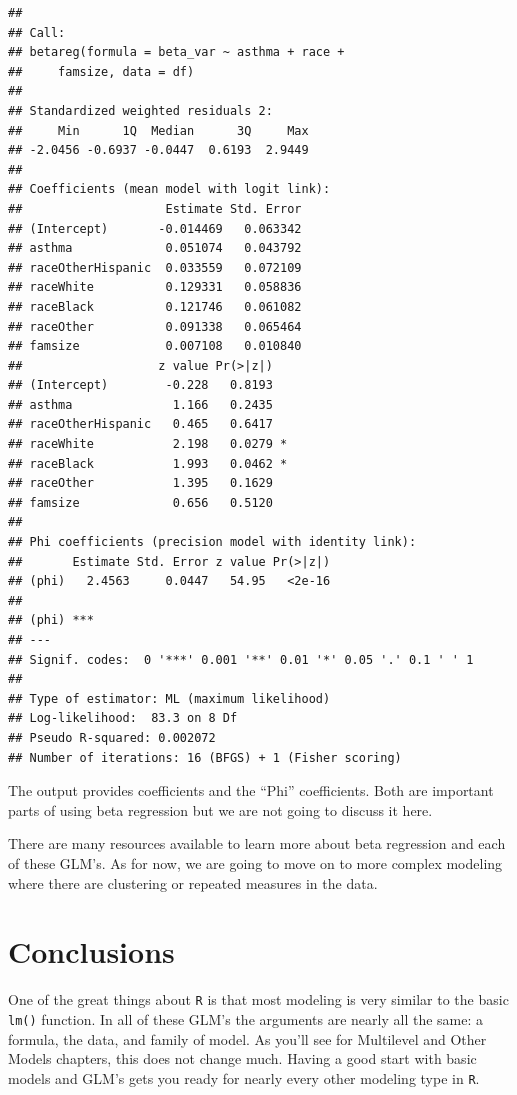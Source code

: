 \documentclass[]{tufte-book}
\theoremstyle{definition}
\theoremstyle{definition}
\theoremstyle{remark}
\begin{document}
\begin{verbatim}
## 
## Call:
## betareg(formula = beta_var ~ asthma + race + 
##     famsize, data = df)
## 
## Standardized weighted residuals 2:
##     Min      1Q  Median      3Q     Max 
## -2.0456 -0.6937 -0.0447  0.6193  2.9449 
## 
## Coefficients (mean model with logit link):
##                    Estimate Std. Error
## (Intercept)       -0.014469   0.063342
## asthma             0.051074   0.043792
## raceOtherHispanic  0.033559   0.072109
## raceWhite          0.129331   0.058836
## raceBlack          0.121746   0.061082
## raceOther          0.091338   0.065464
## famsize            0.007108   0.010840
##                   z value Pr(>|z|)  
## (Intercept)        -0.228   0.8193  
## asthma              1.166   0.2435  
## raceOtherHispanic   0.465   0.6417  
## raceWhite           2.198   0.0279 *
## raceBlack           1.993   0.0462 *
## raceOther           1.395   0.1629  
## famsize             0.656   0.5120  
## 
## Phi coefficients (precision model with identity link):
##       Estimate Std. Error z value Pr(>|z|)
## (phi)   2.4563     0.0447   54.95   <2e-16
##          
## (phi) ***
## ---
## Signif. codes:  0 '***' 0.001 '**' 0.01 '*' 0.05 '.' 0.1 ' ' 1 
## 
## Type of estimator: ML (maximum likelihood)
## Log-likelihood:  83.3 on 8 Df
## Pseudo R-squared: 0.002072
## Number of iterations: 16 (BFGS) + 1 (Fisher scoring)
\end{verbatim}

The output provides coefficients and the ``Phi'' coefficients. Both are
important parts of using beta regression but we are not going to discuss
it here.

There are many resources available to learn more about beta regression
and each of these GLM's. As for now, we are going to move on to more
complex modeling where there are clustering or repeated measures in the
data.

\section*{Conclusions}\label{conclusions-1}

One of the great things about \texttt{R} is that most modeling is very
similar to the basic \texttt{lm()} function. In all of these GLM's the
arguments are nearly all the same: a formula, the data, and family of
model. As you'll see for Multilevel and Other Models chapters, this does
not change much. Having a good start with basic models and GLM's gets
you ready for nearly every other modeling type in \texttt{R}.
\end{document}
